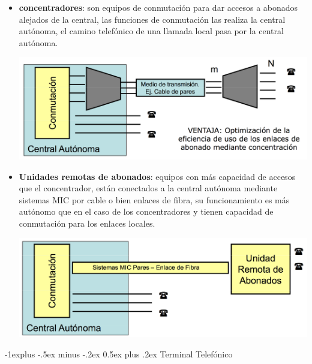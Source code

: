 \documentclass[10pt,portrait, twocolumn]{article}
\makeatletter
\renewcommand{\subsection}{\@startsection{subsection}{2}{0mm}%
                                {-1explus -.5ex minus -.2ex}%
                                {0.5ex plus .2ex}%
                                {\normalfont\normalsize\bfseries}}
\makeatother
\begin{document}
	\begin{itemize}
		\item  \textbf{concentradores}: son equipos de conmutación para dar accesos a abonados alejados de la central, las funciones de conmutación las realiza la central autónoma, el camino telefónico de una llamada local pasa por la central autónoma.

				\begin{center}
					\includegraphics[scale=0.2]{images/RedAcceso}
				\end{center}
		
		\item \textbf{Unidades remotas de abonados}: equipos con más capacidad de accesos que el concentrador, están conectados a la central autónoma mediante sistemas MIC por cable o bien enlaces de fibra, su funcionamiento es más autónomo que en el caso de los concentradores y tienen capacidad de conmutación para los enlaces locales.

			\begin{center}
				\includegraphics[scale=0.2]{images/RDI}
			\end{center}
	\end{itemize}

		
\hrulefill		

\subsection{Terminal Telefónico}
\end{document}
